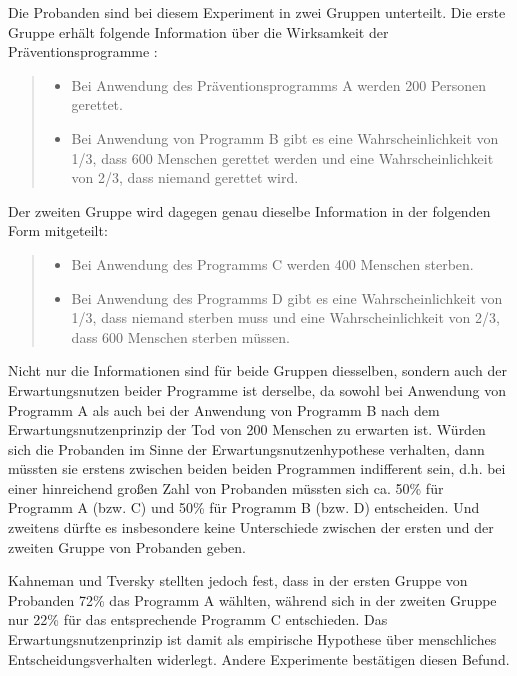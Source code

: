 Die Probanden sind bei diesem Experiment in zwei Gruppen unterteilt. Die 
erste Gruppe
erhält folgende Information über die Wirksamkeit der Präventionsprogramme
\cite[S. 44]{fritz:2002}:\label{tverskyBeispiel}

\begin{quote}
\begin{itemize}
\item Bei Anwendung des Präventionsprogramms A werden 200 Personen gerettet.
\item Bei Anwendung von Programm B gibt es eine Wahrscheinlichkeit von 1/3, dass
600 Menschen gerettet werden und eine Wahrscheinlichkeit von 2/3, dass niemand
gerettet wird.
\end{itemize}
\end{quote}

Der zweiten Gruppe wird dagegen genau dieselbe Information in der folgenden
Form mitgeteilt:

\begin{quote}
\begin{itemize}
\item Bei Anwendung des Programms C werden 400 Menschen sterben.

\item Bei Anwendung des Programms D gibt es eine Wahrscheinlichkeit von 1/3,
dass niemand sterben muss und eine Wahrscheinlichkeit von 2/3, dass 600 Menschen
sterben müssen.
\end{itemize}
\end{quote}

Nicht nur die Informationen sind für beide Gruppen diesselben, sondern auch der
Erwartungsnutzen beider Programme ist derselbe, da sowohl bei Anwendung von
Programm A als auch bei der Anwendung von Programm B nach dem
Erwartungsnutzenprinzip der Tod von 200 Menschen zu erwarten ist. Würden sich
die Probanden im Sinne der Erwartungsnutzenhypothese verhalten, 
dann müssten sie erstens zwischen beiden beiden Programmen
indifferent sein, d.h. bei einer hinreichend großen Zahl von Probanden müssten
sich ca. 50\% für Programm A (bzw. C) und 50\% für Programm B (bzw.
D) entscheiden. Und zweitens dürfte es insbesondere keine Unterschiede zwischen
der ersten und der zweiten Gruppe von Probanden geben. 

Kahneman und Tversky stellten jedoch fest, dass in der ersten Gruppe von
Probanden 72\% das Programm A wählten, während sich in der zweiten Gruppe nur
22\% für das entsprechende Programm C entschieden. Das Erwartungsnutzenprinzip
ist damit als empirische Hypothese über menschliches Entscheidungsverhalten
widerlegt. Andere Experimente bestätigen diesen Befund. 

